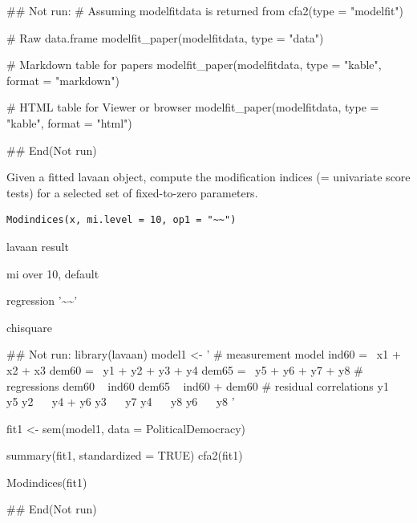 \documentclass[a4paper]{book}
\begin{document}
%
\begin{Examples}
\begin{ExampleCode}
\#\# Not run: 
# Assuming modelfitdata is returned from cfa2(type = "modelfit")

# Raw data.frame
modelfit_paper(modelfitdata, type = "data")

# Markdown table for papers
modelfit_paper(modelfitdata, type = "kable", format = "markdown")

# HTML table for Viewer or browser
modelfit_paper(modelfitdata, type = "kable", format = "html")

## End(Not run)
\end{ExampleCode}
\end{Examples}
%
\begin{Description}
Given a fitted lavaan object, compute the modification indices (= univariate score tests) for a selected set of fixed-to-zero parameters.
\end{Description}
%
\begin{Usage}
\begin{verbatim}
Modindices(x, mi.level = 10, op1 = "~~")
\end{verbatim}
\end{Usage}
%
\begin{Arguments}
\begin{ldescription}
\item[\code{x}] lavaan result

\item[\code{mi.level}] mi over 10, default

\item[\code{op1}] regression '\textasciitilde{}\textasciitilde{}'
\end{ldescription}
\end{Arguments}
%
\begin{Value}
chisquare
\end{Value}
%
\begin{Examples}
\begin{ExampleCode}
\#\# Not run: 
library(lavaan)
model1 <- '
  # measurement model
    ind60 =~ x1 + x2 + x3
    dem60 =~ y1 + y2 + y3 + y4
    dem65 =~ y5 + y6 + y7 + y8
  # regressions
    dem60 ~ ind60
    dem65 ~ ind60 + dem60
 # residual correlations
    y1 ~~ y5
    y2 ~~ y4 + y6
    y3 ~~ y7
    y4 ~~ y8
    y6 ~~ y8
'

fit1 <- sem(model1, data = PoliticalDemocracy)

 summary(fit1, standardized = TRUE)
cfa2(fit1)

Modindices(fit1)

## End(Not run)



\end{ExampleCode}
\end{Examples}
\end{document}
